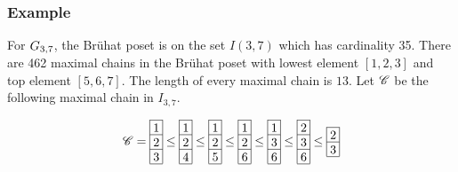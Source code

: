 
\subsubsection{Example}

For \(G_{{3},{7}}\), the Br\"{u}hat poset is on the set \(I(3,7)\) which has cardinality 35. There are 462 maximal chains in the Br\"{u}hat poset with lowest element \([1,2,3]\) and top element \([5,6,7]\). The length of every maximal chain is \(13\). Let \(\mathscr{C}\) be the following maximal chain in \(I_{3,7}\). 

\[
\SC = 
\begin{array}[c]{*{1}c}\cline{1-1}
\lr{1}\\\cline{1-1}
\lr{2}\\\cline{1-1}
\lr{3}\\\cline{1-1}
\end{array}
\le
\begin{array}[c]{*{1}c}\cline{1-1}
\lr{1}\\\cline{1-1}
\lr{2}\\\cline{1-1}
\lr{4}\\\cline{1-1}
\end{array}
\le
\begin{array}[c]{*{1}c}\cline{1-1}
\lr{1}\\\cline{1-1}
\lr{2}\\\cline{1-1}
\lr{5}\\\cline{1-1}
\end{array}
\le
\begin{array}[c]{*{1}c}\cline{1-1}
\lr{1}\\\cline{1-1}
\lr{2}\\\cline{1-1}
\lr{6}\\\cline{1-1}
\end{array}
\le
\begin{array}[c]{*{1}c}\cline{1-1}
\lr{1}\\\cline{1-1}
\lr{3}\\\cline{1-1}
\lr{6}\\\cline{1-1}
\end{array}
\le
\begin{array}[c]{*{1}c}\cline{1-1}
\lr{2}\\\cline{1-1}
\lr{3}\\\cline{1-1}
\lr{6}\\\cline{1-1}
\end{array}
\le
\begin{array}[c]{*{1}c}\cline{1-1}
\lr{2}\\\cline{1-1}
\lr{3}\\\cline{1-1}

\end{array}\]
